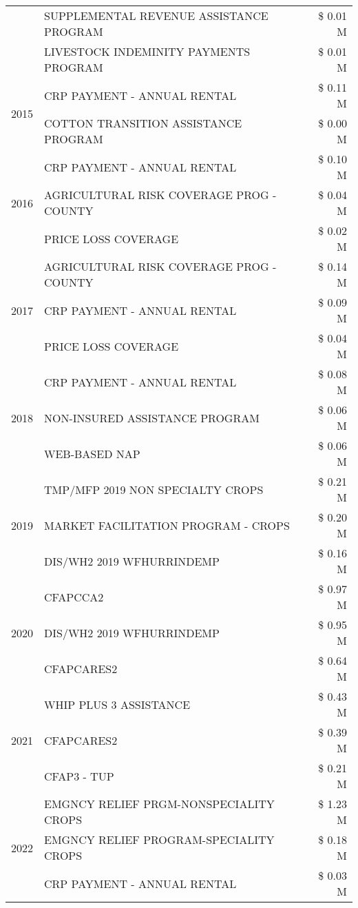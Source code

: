 \begin{tabular}{llr}
 & SUPPLEMENTAL REVENUE ASSISTANCE PROGRAM & \$ 0.01 M \\
 & LIVESTOCK INDEMINITY PAYMENTS PROGRAM & \$ 0.01 M \\
\cline{1-3}
\multirow[t]{2}{*}{2015} & CRP PAYMENT - ANNUAL RENTAL & \$ 0.11 M \\
 & COTTON TRANSITION ASSISTANCE PROGRAM & \$ 0.00 M \\
\cline{1-3}
\multirow[t]{3}{*}{2016} & CRP PAYMENT - ANNUAL RENTAL & \$ 0.10 M \\
 & AGRICULTURAL RISK COVERAGE PROG - COUNTY & \$ 0.04 M \\
 & PRICE LOSS COVERAGE & \$ 0.02 M \\
\cline{1-3}
\multirow[t]{3}{*}{2017} & AGRICULTURAL RISK COVERAGE PROG - COUNTY & \$ 0.14 M \\
 & CRP PAYMENT - ANNUAL RENTAL & \$ 0.09 M \\
 & PRICE LOSS COVERAGE & \$ 0.04 M \\
\cline{1-3}
\multirow[t]{3}{*}{2018} & CRP PAYMENT - ANNUAL RENTAL & \$ 0.08 M \\
 & NON-INSURED ASSISTANCE PROGRAM & \$ 0.06 M \\
 & WEB-BASED NAP & \$ 0.06 M \\
\cline{1-3}
\multirow[t]{3}{*}{2019} & TMP/MFP 2019 NON SPECIALTY CROPS & \$ 0.21 M \\
 & MARKET FACILITATION PROGRAM - CROPS & \$ 0.20 M \\
 & DIS/WH2 2019 WFHURRINDEMP & \$ 0.16 M \\
\cline{1-3}
\multirow[t]{3}{*}{2020} & CFAPCCA2 & \$ 0.97 M \\
 & DIS/WH2 2019 WFHURRINDEMP & \$ 0.95 M \\
 & CFAPCARES2 & \$ 0.64 M \\
\cline{1-3}
\multirow[t]{3}{*}{2021} & WHIP PLUS 3 ASSISTANCE & \$ 0.43 M \\
 & CFAPCARES2 & \$ 0.39 M \\
 & CFAP3 - TUP & \$ 0.21 M \\
\cline{1-3}
\multirow[t]{3}{*}{2022} & EMGNCY RELIEF PRGM-NONSPECIALITY CROPS & \$ 1.23 M \\
 & EMGNCY RELIEF PROGRAM-SPECIALITY CROPS & \$ 0.18 M \\
 & CRP PAYMENT - ANNUAL RENTAL & \$ 0.03 M \\
\cline{1-3}
\bottomrule
\end{tabular}
